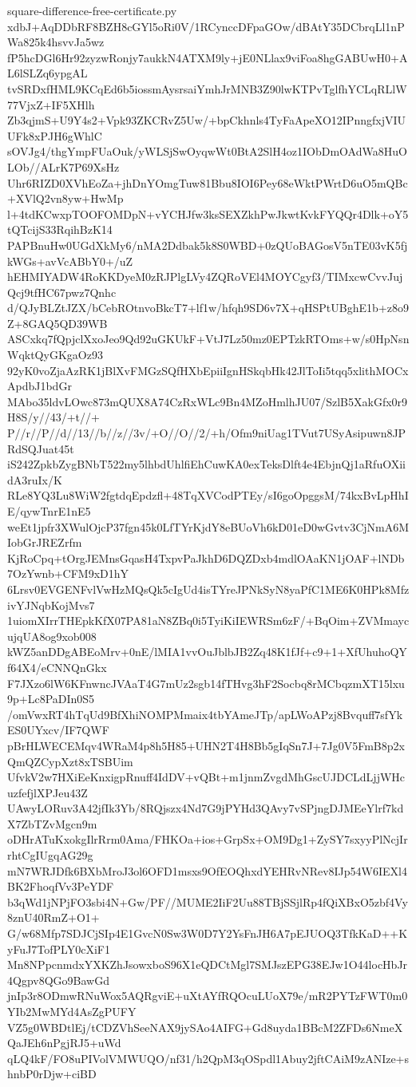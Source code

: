 \documentclass[11pt]{article}
\theoremstyle{definition}
\theoremstyle{remark}
\begin{document}
\begin{filecontents*}[overwrite]{square-difference-free-certificate.py}
xdbJ+AqDDbRF8BZH8cGYl5oRi0V/1RCynccDFpaGOw/dBAtY35DCbrqLl1nPWa825k4hsvvJa5wz
fP5hcDGl6Hr92zyzwRonjy7aukkN4ATXM9ly+jE0NLlax9viFoa8hgGABUwH0+AL6lSLZq6ypgAL
tvSRDxfHML9KCqEd6b5iossmAysrsaiYmhJrMNB3Z90lwKTPvTglfhYCLqRLlW77VjxZ+IF5XHlh
Zb3qjmS+U9Y4s2+Vpk93ZKCRvZ5Uw/+bpCkhnls4TyFaApeXO12IPnngfxjVIUUFk8xPJH6gWhlC
sOVJg4/thgYmpFUaOuk/yWLSjSwOyqwWt0BtA2SlH4oz1IObDmOAdWa8HuOLOb//ALrK7P69XsHz
Uhr6RIZD0XVhEoZa+jhDnYOmgTuw81Bbu8IOI6Pey68eWktPWrtD6uO5mQBc+XVlQ2vn8yw+HwMp
l+4tdKCwxpTOOFOMDpN+vYCHJfw3ksSEXZkhPwJkwtKvkFYQQr4Dlk+oY5tQTcijS33RqihBzK14
PAPBnuHw0UGdXkMy6/nMA2Ddbak5k8S0WBD+0zQUoBAGosV5nTE03vK5fjkWGs+avVcABbY0+/uZ
hEHMIYADW4RoKKDyeM0zRJPlgLVy4ZQRoVEl4MOYCgyf3/TIMxcwCvvJujQcj9tfHC67pwz7Qnhc
d/QJyBLZtJZX/bCebROtnvoBkcT7+lf1w/hfqh9SD6v7X+qHSPtUBghE1b+z8o9Z+8GAQ5QD39WB
ASCxkq7fQpjclXxoJeo9Qd92uGKUkF+VtJ7Lz50mz0EPTzkRTOms+w/s0HpNsnWqktQyGKgaOz93
92yK0voZjaAzRK1jBlXvFMGzSQfHXbEpiiIgnHSkqbHk42JlToIi5tqq5xlithMOCxApdbJ1bdGr
MAbo35ldvLOwc873mQUX8A74CzRxWLc9Bn4MZoHmlhJU07/SzlB5XakGfx0r9H8S/y//43/+t//+
P//r//P//d//13//b//z//3v/+O//O//2/+h/Ofm9niUag1TVut7USyAsipuwn8JPRdSQJuat45t
iS242ZpkbZygBNbT522my5lhbdUhlfiEhCuwKA0exTeksDlft4e4EbjnQj1aRfuOXiidA3ruIx/K
RLe8YQ3Lu8WiW2fgtdqEpdzfl+48TqXVCodPTEy/sI6goOpggsM/74kxBvLpHhIE/qywTnrE1nE5
weEt1jpfr3XWulOjcP37fgn45k0LfTYrKjdY8eBUoVh6kD01eD0wGvtv3CjNmA6MIobGrJREZrfm
KjRoCpq+tOrgJEMnsGqasH4TxpvPaJkhD6DQZDxb4mdlOAaKN1jOAF+lNDb7OzYwnb+CFM9xD1hY
6Lrsv0EVGENFvlVwHzMQsQk5cIgUd4isTYreJPNkSyN8yaPfC1ME6K0HPk8MfzivYJNqbKojMvs7
1uiomXIrrTHEpkKfX07PA81aN8ZBq0i5TyiKiIEWRSm6zF/+BqOim+ZVMmaycujqUA8og9xob008
kWZ5anDDgABEoMrv+0nE/lMIA1vvOuJblbJB2Zq48K1fJf+c9+1+XfUhuhoQYf64X4/eCNNQnGkx
F7JXzo6lW6KFnwncJVAaT4G7mUz2sgb14fTHvg3hF2Socbq8rMCbqzmXT15lxu9p+Lc8PaDIn0S5
/omVwxRT4hTqUd9BfXhiNOMPMmaix4tbYAmeJTp/apLWoAPzj8Bvquff7sfYkES0UYxcv/IF7QWF
pBrHLWECEMqv4WRaM4p8h5H85+UHN2T4H8Bb5gIqSn7J+7Jg0V5FmB8p2xQmQZCypXzt8xTSBUim
UfvkV2w7HXiEeKnxigpRnuff4IdDV+vQBt+m1jnmZvgdMhGscUJDCLdLjjWHcuzfefjlXPJeu43Z
UAwyLORuv3A42jfIk3Yb/8RQjszx4Nd7G9jPYHd3QAvy7vSPjngDJMEeYlrf7kdX7ZbTZvMgcn9m
oDHrATuKxokgIlrRrm0Ama/FHKOa+ios+GrpSx+OM9Dg1+ZySY7sxyyPlNcjIrrhtCgIUgqAG29g
mN7WRJDfk6BXbMroJ3ol6OFD1msxs9OfEOQhxdYEHRvNRev8IJp54W6IEXl4BK2FhoqfVv3PeYDF
b3qWd1jNPjFO3sbi4N+Gw/PF//MUME2IiF2Uu88TBjSSjlRp4fQiXBxO5zbf4Vy8znU40RmZ+O1+
G/w68Mfp7SDJCjSIp4E1GvcN0Sw3W0D7Y2YsFnJH6A7pEJUOQ3TfkKaD++KyFuJ7TofPLY0cXiF1
Mn8NPpcnmdxYXKZhJsowxboS96X1eQDCtMgl7SMJszEPG38EJw1O44locHbJr4Qgpv8QGo9BawGd
jnIp3r8ODmwRNuWox5AQRgviE+uXtAYfRQOcuLUoX79e/mR2PYTzFWT0m0YIb2MwMYd4AsZgPUFY
VZ5g0WBDtlEj/tCDZVhSeeNAX9jySAo4AIFG+Gd8uyda1BBcM2ZFDs6NmeXQaJEh6nPgjRJ5+uWd
qLQ4kF/FO8uPIVolVMWUQO/nf31/h2QpM3qOSpdl1Abuy2jftCAiM9zANIze+shnbP0rDjw+ciBD

\end{filecontents*}
\end{document}
